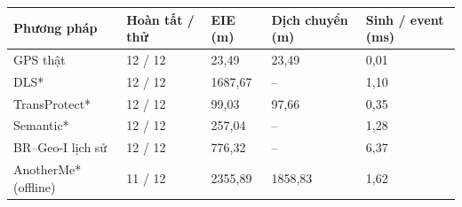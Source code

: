 \par\smallskip\noindent\begin{tabularx}{\linewidth}{@{}P{4.4cm}XXXX@{}}\toprule
\textbf{Phương pháp} & \textbf{Hoàn tất / thử} & \textbf{EIE (m)} & \textbf{Dịch chuyển (m)} & \textbf{Sinh / event (ms)} \\
\midrule
GPS thật & 12 / 12 & 23{,}49 & 23{,}49 & 0{,}01 \\
DLS* & 12 / 12 & 1687{,}67 & -- & 1{,}10 \\
TransProtect* & 12 / 12 & 99{,}03 & 97{,}66 & 0{,}35 \\
Semantic* & 12 / 12 & 257{,}04 & -- & 1{,}28 \\
BR--Geo-I lịch sử & 12 / 12 & 776{,}32 & -- & 6{,}37 \\
AnotherMe* (offline) & 11 / 12 & 2355{,}89 & 1858{,}83 & 1{,}62 \\
\bottomrule\end{tabularx}\par\smallskip
